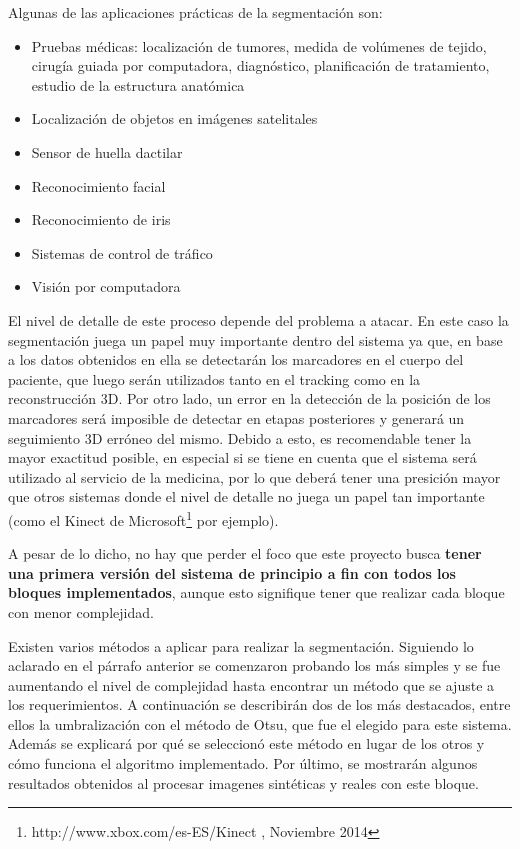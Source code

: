 Algunas de las aplicaciones prácticas de la segmentación son:
\begin{itemize}
\item Pruebas médicas: localización de tumores, medida de volúmenes de tejido, cirugía guiada por computadora, diagnóstico, planificación de tratamiento, estudio de la estructura anatómica
\item Localización de objetos en imágenes satelitales
\item Sensor de  huella dactilar
\item Reconocimiento facial
\item Reconocimiento de iris
\item Sistemas de control de tráfico
\item Visión por computadora
\end{itemize}

El nivel de detalle de este proceso depende del problema a atacar. En este caso la segmentación juega un papel muy importante dentro del sistema ya que, en base a los datos obtenidos en ella se detectarán los marcadores en el cuerpo del paciente, que luego serán utilizados tanto en el tracking como en la reconstrucción 3D. Por otro lado, un error en la detección de la posición de los marcadores será imposible de detectar en etapas posteriores y generará un seguimiento 3D erróneo del mismo. Debido a esto, es recomendable tener la mayor exactitud posible, en especial si se tiene en cuenta que el sistema será utilizado al servicio de la medicina, por lo que deberá tener una presición mayor que otros sistemas donde el nivel de detalle no juega un papel tan importante (como el Kinect de Microsoft\footnote{http://www.xbox.com/es-ES/Kinect , Noviembre 2014} por ejemplo).

A pesar de lo dicho, no hay que perder el foco que este proyecto busca \textbf{tener una primera versión del sistema de principio a fin con todos los bloques implementados}, aunque esto signifique tener que realizar cada bloque con menor complejidad.

Existen varios métodos a aplicar para realizar la segmentación. Siguiendo lo aclarado en el párrafo anterior se comenzaron probando los más simples y se fue aumentando el nivel de complejidad hasta encontrar un método que se ajuste a los requerimientos. A continuación se describirán dos de los más destacados, entre ellos la umbralización con el método de Otsu\cite{otsu}, que fue el elegido para este sistema. Además se explicará por qué se seleccionó este método en lugar de los otros y cómo funciona el algoritmo implementado. Por último, se mostrarán algunos resultados obtenidos al procesar imagenes sintéticas y reales con este bloque.

